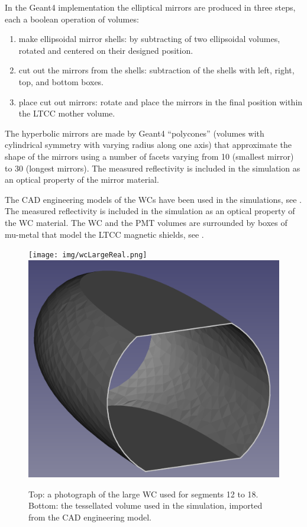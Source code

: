 In the Geant4 implementation the elliptical mirrors are produced in three steps, each a boolean operation of volumes:

\begin{enumerate}
	\item make ellipsoidal mirror shells: by subtracting of two ellipsoidal volumes, rotated and centered on their designed position.
	\item cut out the mirrors from the shells: subtraction of the shells with left, right, top, and bottom boxes.
	\item place cut out mirrors: rotate and place the mirrors in the final position within the LTCC mother volume.
\end{enumerate}

The hyperbolic mirrors are made by Geant4 ``polycones'' (volumes with cylindrical symmetry
with varying radius along one axis) that approximate the shape of the mirrors using a number of facets
varying from 10 (smallest mirror) to 30 (longest mirrors). The measured reflectivity is included in the simulation as
an optical property of the mirror material.

The CAD engineering models of the WCs have been used in the simulations, see .
The measured reflectivity is included in the simulation as an optical property of the WC material.
The WC and the PMT volumes are surrounded by boxes of mu-metal that model the LTCC magnetic shields, see .

\begin{figure}
	\centering
	\texttt{[image: img/wcLargeReal.png]}
	\includegraphics[width=0.99\columnwidth,keepaspectratio]{img/wcLargeSim.png}
	\caption{Top: a photograph of the large WC used for segments 12 to 18. Bottom: the tessellated volume used in the
            simulation, imported from the CAD engineering model.}
	\label{fig:wcSimulation}
\end{figure}

